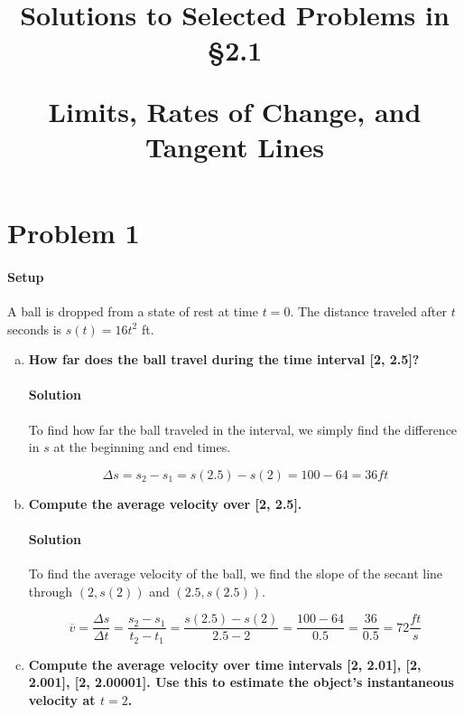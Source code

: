 \documentclass{article}
\title{Solutions to Selected Problems in §2.1\par
Limits, Rates of Change, and Tangent Lines}
\begin{document}
  \maketitle
  \newpage

  \section{Problem 1}
  \paragraph{Setup} A ball is dropped from a state of rest at time \( t = 0 \). The distance traveled after \( t \) seconds is \( s(t) = 16t^2 \) ft.
  \begin{enumerate}[(a)]
    \item \textbf{How far does the ball travel during the time interval [2, 2.5]?}

    \paragraph{Solution} To find how far the ball traveled in the interval, we simply find the difference in \(s\) at the beginning and end times.

    \begin{equation} \label{ballDistance1}
      \Delta{s} = s_{2} - s_{1} = s(2.5) - s(2) = 100 - 64 = \boxed{36 ft}
    \end{equation}

    \item \textbf{Compute the average velocity over [2, 2.5].}

    \paragraph{Solution} To find the average velocity of the ball, we find the slope of the secant line through \((2, s(2)) \) and \( (2.5, s(2.5)) \).

    \begin{equation}
      \overline{v} = \frac{\Delta{s}}{\Delta{t}} = \frac{s_{2} - s_{1}}{t_{2} - t_{1}} = \frac{s(2.5) - s(2)}{2.5 - 2} = \frac{100 - 64}{0.5} = \frac{36}{0.5} = \boxed{72 \frac{ft}{s}}
    \end{equation}
    \item \textbf{Compute the average velocity over time intervals [2, 2.01], [2, 2.001], [2, 2.00001]. Use this to estimate the object's instantaneous velocity at \( t = 2 \).}

\end{enumerate}
\end{document}
